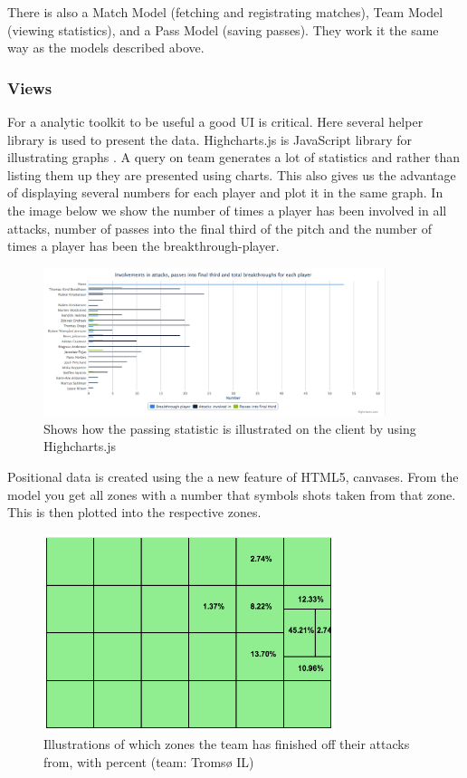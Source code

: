 There is also a Match Model (fetching and registrating matches), Team Model (viewing statistics), and a Pass Model (saving passes). They work it the same way as the models described above.

\subsubsection{Views}

For a analytic toolkit to be useful a good UI is critical. Here several helper library is used to present the data. Highcharts.js is JavaScript library for illustrating graphs \cite{}. A query on team generates a lot of statistics and rather than listing them up they are presented using charts. This also gives us the advantage of displaying several numbers for each player and plot it in the same graph. In the image below we show the number of times a player has been involved in all attacks, number of passes into the final third of the pitch and the number of times a player has been the breakthrough-player.

\begin{figure}[ht!]
\centering
\includegraphics[width=100mm]{images/general/chart_passes.png}
\caption{Shows how the passing statistic is illustrated on the client by using Highcharts.js}
\label{overflow}
\end{figure}

Positional data is created using the a new feature of HTML5, canvases. From the model you get all zones with a number that symbols shots taken from that zone. This is then plotted into the respective zones. 

\begin{figure}[ht!]
\centering
\includegraphics[width=85mm]{images/general/finishing_zones.png}
\caption{Illustrations of which zones the team has finished off their attacks from, with percent (team: Tromsø IL)}
\label{overflow}
\end{figure}

